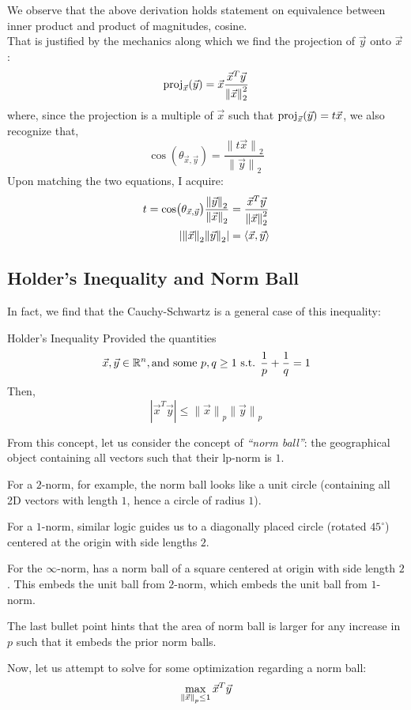 We observe that the above derivation holds statement on equivalence between inner product and product of magnitudes, cosine. \\
That is justified by the mechanics along which we find the projection of $\vec{y}$ onto $\vec{x}$:
\[
    \proj{\vec{x}}{\vec{y}} = \vec{x} \frac{\vec{x}^T\vec{y}}{{\lVert \vec{x} \rVert}_2^2}
\]
where, since the projection is a multiple of $\vec{x}$ such that $\proj{\vec{x}}{\vec{y}} = t\vec{x}$, we also recognize that,
\[
    \cos(\theta_{\vec{x}, \vec{y}}) = \frac{{\lVert t\vec{x} \rVert}_2}{{\lVert \vec{y} \rVert}_2}
\]
Upon matching the two equations, I acquire:
\begin{align*}
    t = \cos(\theta_{\vec{x}, \vec{y}}) \frac{\pnorm{\vec{y}}{2}}{\pnorm{\vec{x}}{2}} &= \frac{\vec{x}^T\vec{y}}{\pnorm[2]{\vec{x}}{2}} \\
    |{\lVert \vec{x} \rVert}_2 {\lVert \vec{y} \rVert}_2| &= \langle \vec{x}, \vec{y} \rangle
\end{align*}

\subsection{Holder's Inequality and Norm Ball}
In fact, we find that the Cauchy-Schwartz is a general case of this inequality:
\begin{ln-define}{Holder's Inequality}{}
    Provided the quantities
    \[\vec{x}, \vec{y} \in \R^n, \text{and some } p, q \geq 1 \text{ s.t. } \frac{1}{p} + \frac{1}{q} = 1\]
    Then, 
    \[|\vec{x}^T \vec{y}| \leq {\lVert \vec{x} \rVert}_p{\lVert \vec{y} \rVert}_p\]
\end{ln-define}
From this concept, let us consider the concept of \textit{``norm ball''}: the geographical object containing all vectors such that their lp-norm is $1$.

\begin{bindenum}
    \item For a $2$-norm, for example, the norm ball looks like a unit circle (containing all 2D vectors with length $1$, hence a circle of radius $1$).
    \item For a $1$-norm, similar logic guides us to a diagonally placed circle (rotated $45^\circ$) centered at the origin with side lengths $2$.
    \item For the $\infty$-norm, has a norm ball of a square centered at origin with side length $2$. This embeds the unit ball from $2$-norm, which embeds the unit ball from $1$-norm.
\end{bindenum}
The last bullet point hints that the area of norm ball is larger for any increase in $p$ such that it embeds the prior norm balls.
\par
Now, let us attempt to solve for some optimization regarding a norm ball:
\[\max_{\pnorm{\vec{x}}{p} \leq 1} \vec{x}^T \vec{y}\]

